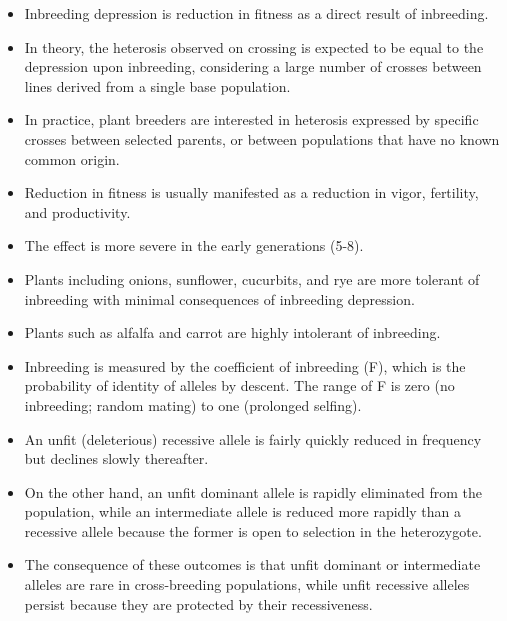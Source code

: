 \documentclass[11pt,ignorenonframetext,aspectratio=169]{beamer}
\providecommand{\tightlist}{%
  \setlength{\itemsep}{0pt}\setlength{\parskip}{0pt}}
\begin{document}
\begin{frame}{}
\protect\hypertarget{section-1}{}
\begin{itemize}
\tightlist
\item
  Inbreeding depression is reduction in fitness as a direct result of
  inbreeding.
\item
  In theory, the heterosis observed on crossing is expected to be equal
  to the depression upon inbreeding, considering a large number of
  crosses between lines derived from a single base population.
\item
  In practice, plant breeders are interested in heterosis expressed by
  specific crosses between selected parents, or between populations that
  have no known common origin.
\item
  Reduction in fitness is usually manifested as a reduction in vigor,
  fertility, and productivity.
\item
  The effect is more severe in the early generations (5-8).
\item
  Plants including onions, sunflower, cucurbits, and rye are more
  tolerant of inbreeding with minimal consequences of inbreeding
  depression.
\item
  Plants such as alfalfa and carrot are highly intolerant of inbreeding.
\end{itemize}
\end{frame}

\begin{frame}{}
\protect\hypertarget{section-2}{}
\begin{itemize}
\tightlist
\item
  Inbreeding is measured by the coefficient of inbreeding (F), which is
  the probability of identity of alleles by descent. The range of F is
  zero (no inbreeding; random mating) to one (prolonged selfing).
\item
  An unfit (deleterious) recessive allele is fairly quickly reduced in
  frequency but declines slowly thereafter.
\item
  On the other hand, an unfit dominant allele is rapidly eliminated from
  the population, while an intermediate allele is reduced more rapidly
  than a recessive allele because the former is open to selection in the
  heterozygote.
\item
  The consequence of these outcomes is that unfit dominant or
  intermediate alleles are rare in cross-breeding populations, while
  unfit recessive alleles persist because they are protected by their
  recessiveness.
\end{itemize}
\end{frame}
\end{document}
